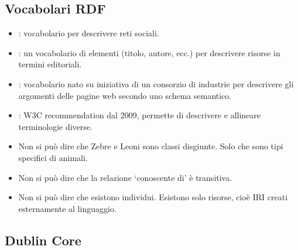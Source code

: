 \subsection{Vocabolari RDF}

\begin{itemize}
  \item {}: vocabolario per
descrivere reti sociali. 
\item {}: un vocabolario di elementi
(titolo, autore, ecc.) per descrivere risorse in
termini editoriali.
\item {}: vocabolario nato su iniziativa di
un consorzio di industrie per descrivere gli
argomenti delle pagine web secondo uno
schema semantico. 
\item {}: W3C recommendation dal 2009,
permette di descrivere e allineare
terminologie diverse.
\end{itemize}




\begin{itemize}
  \item Non si può dire che Zebre e Leoni sono classi
disgiunte. Solo che sono tipi specifici di animali. 
\item Non si può dire che la relazione ‘conoscente di’ è
transitiva. 
\item Non si può dire che esistono individui. Esistono solo risorse, cioè IRI creati esternamente al
linguaggio.
\end{itemize}

\subsection{Dublin Core}

